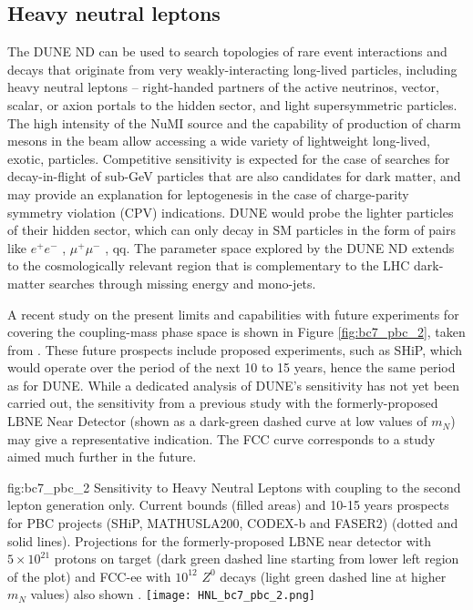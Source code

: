 \subsection{Heavy neutral leptons}
 The DUNE ND can be used to search topologies of rare event interactions and decays that originate
 from very weakly-interacting long-lived particles, including heavy neutral leptons -- right-handed
 partners of the active neutrinos, vector, scalar, or axion portals to the hidden sector, and light
 supersymmetric particles. The high intensity of the NuMI source and the capability of production
 of charm mesons in the beam allow accessing a wide variety of lightweight long-lived, exotic,
 particles. Competitive sensitivity is expected for the case of searches for decay-in-flight of sub-GeV
 particles that are also candidates for dark matter, and may provide an explanation for leptogenesis
 in the case of charge-parity symmetry violation (CPV) indications. DUNE would probe the lighter
 particles of their hidden sector, which can only decay in SM particles in the form of pairs like $e^+e^-$ ,
 $\mu^+\mu^-$ , qq. The parameter space explored by the DUNE ND extends to the cosmologically relevant
region that is complementary to the LHC dark-matter searches through missing energy
 and mono-jets. 

A recent study on the present limits  and capabilities with future experiments for covering the coupling-mass phase space 
is shown in Figure \ref{fig:bc7_pbc_2}, taken from \cite{Beacham:2019nyx}. These future prospects include proposed experiments, such as SHiP, 
which would operate over the period of the next 10 to 15 years, hence the same period as for DUNE.  While a dedicated analysis of DUNE's sensitivity has not yet been carried out, the sensitivity from a previous study with the formerly-proposed LBNE Near Detector (shown as a dark-green dashed curve at low values of $m_N$) may give a representative indication.
The FCC curve corresponds to a study aimed much further in the future.

\begin{dunefigure}{fig:bc7_pbc_2}
    {Sensitivity to Heavy Neutral Leptons with coupling to the second lepton generation only.
    Current bounds (filled areas) and 10-15 years prospects for PBC projects (SHiP, MATHUSLA200, CODEX-b and FASER2) (dotted and solid lines).
    Projections for the formerly-proposed LBNE near detector with $5 \times 10^{21}$ protons on target (dark green dashed line starting 
    from lower left region of the plot) and FCC-ee with $10^{12}$ $Z^0$
    decays (light green dashed line at higher $m_N$ values) also shown .}
  \texttt{[image: HNL\_bc7\_pbc\_2.png]}
\end{dunefigure}

